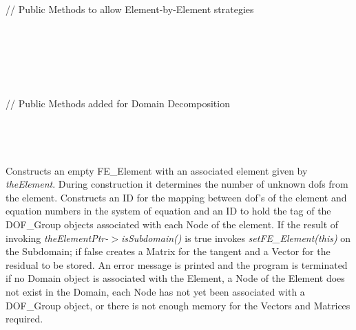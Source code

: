 \indent{}\\ 
\indent{}\\ 
\indent{}\\ 
\indent{}\\ 
\indent{}\\  \\
\indent\indent // Public Methods to allow Element-by-Element strategies \\
\indent{}\\
\indent{}\\ 
\indent{}\\ 
\indent{}\\
\indent{}\\ \\
\indent\indent // Public Methods added for Domain Decomposition \\
\indent{} \\
\indent{} \\

  \\
  \\
Constructs an empty FE\_Element with an associated element given by {\em
theElement}.  During construction it determines the number of unknown
dofs from the element. Constructs an ID for the mapping between dof's of
the element and equation numbers in the system of equation and an ID
to hold the tag of the DOF\_Group objects associated with each Node of
the element. If the result of invoking {\em
theElementPtr-$>$isSubdomain()} is \p true invokes {\em
setFE\_Element(this)} on the Subdomain; if false creates a Matrix 
for the tangent and a Vector for the residual to be stored. An error
message is printed and the program is terminated if no Domain object
is associated with the Element, a Node of the Element does not exist
in the Domain, each Node has not yet been associated with a DOF\_Group
object, or there is not enough memory for the Vectors and Matrices
required. \\  

